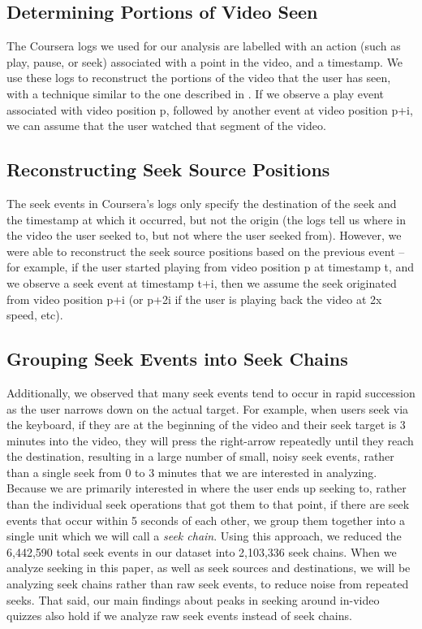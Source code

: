 \documentclass{sigchi}
\begin{document}
\subsection{Determining Portions of Video Seen}

The Coursera logs we used for our analysis are labelled with an action (such as play, pause, or seek) associated with a point in the video, and a timestamp. We use these logs to reconstruct the portions of the video that the user has seen, with a technique similar to the one described in \cite{juho}. If we observe a play event associated with video position p, followed by another event at video position p+i, we can assume that the user watched that segment of the video.

\subsection{Reconstructing Seek Source Positions}

The seek events in Coursera's logs only specify the destination of the seek and the timestamp at which it occurred, but not the origin (the logs tell us where in the video the user seeked to, but not where the user seeked from). However, we were able to reconstruct the seek source positions based on the previous event -- for example, if the user started playing from video position p at timestamp t, and we observe a seek event at timestamp t+i, then we assume the seek originated from video position p+i (or p+2i if the user is playing back the video at 2x speed, etc).

\subsection{Grouping Seek Events into Seek Chains}

Additionally, we observed that many seek events tend to occur in rapid succession as the user narrows down on the actual target. For example, when users seek via the keyboard, if they are at the beginning of the video and their seek target is 3 minutes into the video, they will press the right-arrow repeatedly until they reach the destination, resulting in a large number of small, noisy seek events, rather than a single seek from 0 to 3 minutes that we are interested in analyzing. Because we are primarily interested in where the user ends up seeking to, rather than the individual seek operations that got them to that point, if there are seek events that occur within 5 seconds of each other, we group them together into a single unit which we will call a \textit{seek chain}. Using this approach, we reduced the 6,442,590 total seek events in our dataset into 2,103,336 seek chains. When we analyze seeking in this paper, as well as seek sources and destinations, we will be analyzing seek chains rather than raw seek events, to reduce noise from repeated seeks. That said, our main findings about peaks in seeking around in-video quizzes also hold if we analyze raw seek events instead of seek chains.
\end{document}
